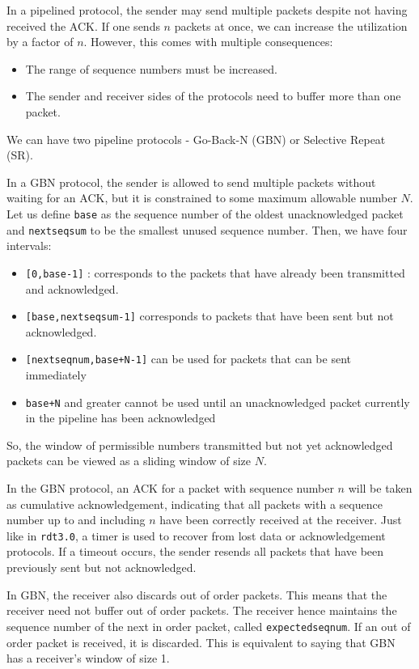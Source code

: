 \documentclass[12pt,letterpaper]{amsbook}
\theoremstyle{definition}
\begin{document}
In a pipelined protocol, the sender may send multiple packets despite not having received the ACK. If one sends $n$ packets at once, we can increase the utilization by a factor of $n$. However, this comes with multiple consequences:

\begin{itemize}
  \item The range of sequence numbers must be increased.
  \item The sender and receiver sides of the protocols need to buffer more than one packet.
\end{itemize}

We can have two pipeline protocols - Go-Back-N (GBN) or Selective Repeat (SR).

In a GBN protocol, the sender is  allowed to send multiple packets without waiting for an ACK, but it is constrained to some maximum allowable number $N$. Let us define \texttt{base} as the sequence number of the oldest unacknowledged packet and \texttt{nextseqsum} to be the smallest unused sequence number. Then, we have four intervals:

\begin{itemize}
  \item \texttt{[0,base-1]} : corresponds to the packets that have already been transmitted and acknowledged.
  \item \texttt{[base,nextseqsum-1]} corresponds to packets that have been sent but not acknowledged.
  \item \texttt{[nextseqnum,base+N-1]} can be used for packets that can be sent immediately
  \item \texttt{base+N} and greater cannot be used until an unacknowledged packet currently in the pipeline has been acknowledged 
\end{itemize}

So, the window of permissible numbers transmitted but not yet acknowledged packets can be viewed as a sliding window of size $N$.

In the GBN protocol, an ACK for a packet with sequence number $n$ will be taken as cumulative acknowledgement, indicating that all packets with a sequence number up to and including $n$ have been correctly received at the receiver. Just like in \texttt{rdt3.0}, a timer is used to recover from lost data or acknowledgement protocols. If a timeout occurs, the sender resends all packets that have been previously sent but not acknowledged.

In GBN, the receiver also discards out of order packets. This means that the receiver need not buffer out of order packets. The receiver hence maintains the sequence number of the next in order packet, called \texttt{expectedseqnum}. If an out of order packet is received, it is discarded. This is equivalent to saying that GBN has a receiver's window of size 1.
\end{document}
